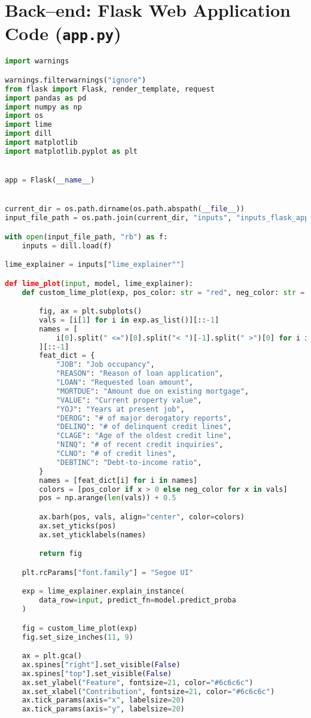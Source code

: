 \section{Back--end: Flask Web Application Code (\lstinline{app.py})}
\begin{lstlisting}[language=Python, basicstyle=\footnotesize\ttfamily]
import warnings

warnings.filterwarnings("ignore")
from flask import Flask, render_template, request
import pandas as pd
import numpy as np
import os
import lime
import dill
import matplotlib
import matplotlib.pyplot as plt


app = Flask(__name__)


current_dir = os.path.dirname(os.path.abspath(__file__))
input_file_path = os.path.join(current_dir, "inputs", "inputs_flask_app_dict.pkl")

with open(input_file_path, "rb") as f:
	inputs = dill.load(f)

lime_explainer = inputs["lime_explainer""]    

def lime_plot(input, model, lime_explainer):
	def custom_lime_plot(exp, pos_color: str = "red", neg_color: str = "green"):

		fig, ax = plt.subplots()
		vals = [i[1] for i in exp.as_list()][::-1]
		names = [
			i[0].split(" <=")[0].split("< ")[-1].split(" >")[0] for i in exp.as_list()
		][::-1]
		feat_dict = {
			"JOB": "Job occupancy",
			"REASON": "Reason of loan application",
			"LOAN": "Requested loan amount",
			"MORTDUE": "Amount due on existing mortgage",
			"VALUE": "Current property value",
			"YOJ": "Years at present job",
			"DEROG": "# of major derogatory reports",
			"DELINQ": "# of delinquent credit lines",
			"CLAGE": "Age of the oldest credit line",
			"NINQ": "# of recent credit inquiries",
			"CLNO": "# of credit lines",
			"DEBTINC": "Debt-to-income ratio",
		}
		names = [feat_dict[i] for i in names]
		colors = [pos_color if x > 0 else neg_color for x in vals]
		pos = np.arange(len(vals)) + 0.5

		ax.barh(pos, vals, align="center", color=colors)
		ax.set_yticks(pos)
		ax.set_yticklabels(names)

		return fig

	plt.rcParams["font.family"] = "Segoe UI"

	exp = lime_explainer.explain_instance(
		data_row=input, predict_fn=model.predict_proba
	)

	fig = custom_lime_plot(exp)
	fig.set_size_inches(11, 9)

	ax = plt.gca()
	ax.spines["right"].set_visible(False)
	ax.spines["top"].set_visible(False)
	ax.set_ylabel("Feature", fontsize=21, color="#6c6c6c")
	ax.set_xlabel("Contribution", fontsize=21, color="#6c6c6c")
	ax.tick_params(axis="x", labelsize=20)
	ax.tick_params(axis="y", labelsize=20)


\end{lstlisting}

